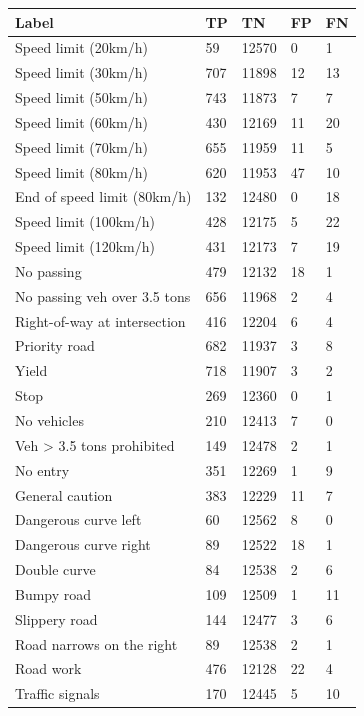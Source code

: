 \begin{table}[ht!]
\centering
  \begin{tabular}{| l | p{1.5cm} | p{2cm} | p{1.5cm} | p{1.5cm} |}
  \hline
  \rowcolor{lightgray} Label & TP & TN & FP & FN \\ [0.5ex]
  \hline
  Speed limit (20km/h) & 59 & 12570 & 0 & 1 \\
  Speed limit (30km/h) & 707 & 11898 & 12 & 13 \\
  Speed limit (50km/h) & 743 & 11873 & 7 & 7 \\
  Speed limit (60km/h) & 430 & 12169 & 11 & 20 \\
  Speed limit (70km/h) & 655 & 11959 & 11 & 5 \\
  Speed limit (80km/h) & 620 & 11953 & 47 & 10 \\
  End of speed limit (80km/h) & 132 & 12480 & 0 & 18 \\
  Speed limit (100km/h) & 428 & 12175 & 5 & 22 \\
  Speed limit (120km/h) & 431 & 12173 & 7 & 19 \\
  No passing & 479 & 12132 & 18 & 1 \\
  No passing veh over 3.5 tons & 656 & 11968 & 2 & 4 \\
  Right-of-way at intersection & 416 & 12204 & 6 & 4 \\
  Priority road & 682 & 11937 & 3 & 8 \\
  Yield & 718 & 11907 & 3 & 2 \\
  Stop & 269 & 12360 & 0 & 1 \\
  No vehicles & 210 & 12413 & 7 & 0 \\
  Veh > 3.5 tons prohibited & 149 & 12478 & 2 & 1 \\
  No entry & 351 & 12269 & 1 & 9 \\
  General caution & 383 & 12229 & 11 & 7 \\
  Dangerous curve left & 60 & 12562 & 8 & 0 \\
  Dangerous curve right & 89 & 12522 & 18 & 1 \\
  Double curve & 84 & 12538 & 2 & 6 \\
  Bumpy road & 109 & 12509 & 1 & 11 \\
  Slippery road & 144 & 12477 & 3 & 6 \\
  Road narrows on the right & 89 & 12538 & 2 & 1 \\
  Road work & 476 & 12128 & 22 & 4 \\
  Traffic signals & 170 & 12445 & 5 & 10 \\

\end{tabular}
\end{table}
